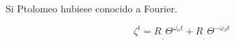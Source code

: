 \documentclass[preview]{standalone}
\begin{document}
\begin{center}
Si Ptolomeo  hubiese conocido a Fourier.

$$\zeta ^ t=  R_{_{_+}} \Theta^{\omega_{\alpha} t} +R_{_{_-}} \Theta^{-\omega_{\beta} t}$$
\end{center}
\end{document}
